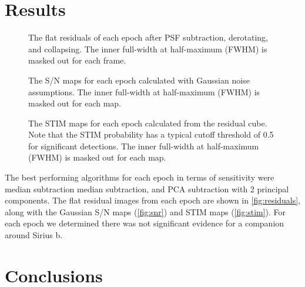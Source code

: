 \documentclass[twocolumn]{aastex631}
\begin{document}
\section{Results} \label{sec:results}

\begin{figure*}
    \centering
    \caption{The flat residuals of each epoch after PSF subtraction, derotating, and collapsing. The inner full-width at half-maximum (FWHM) is masked out for each frame.}
    \label{fig:residuals}
\end{figure*}

\begin{figure*}
    \centering
    \caption{The S/N maps for each epoch calculated with Gaussian noise assumptions. The inner full-width at half-maximum (FWHM) is masked out for each map.}
    \label{fig:snr}
\end{figure*}

\begin{figure*}
    \centering
    \caption{The STIM maps for each epoch calculated from the residual cube. Note that the STIM probability has a typical cutoff threshold of 0.5 for significant detections. The inner full-width at half-maximum (FWHM) is masked out for each map.}
    \label{fig:stim}
\end{figure*}


The best performing algorithms for each epoch in terms of sensitivity were median subtraction median subtraction, and PCA subtraction with 2 principal components. The flat residual images from each epoch are shown in \autoref{fig:residuals}, along with the Gaussian S/N maps (\autoref{fig:snr}) and STIM maps (\autoref{fig:stim}). For each epoch we determined there was not significant evidence for a companion around Sirius b.



\section{Conclusions} \label{sec:conclusion}


\begin{acknowledgments}

\end{acknowledgments}

\end{document}

